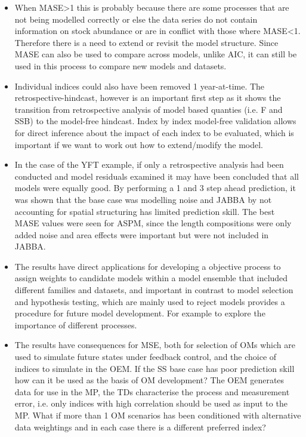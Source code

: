 \begin{itemize}
    \item When MASE>1 this is probably because there are some processes that are not being modelled correctly or else the data series do not contain information on stock abundance or are in conflict with those where MASE<1. Therefore there is a need to extend or revisit the model structure. Since MASE can also be used to compare across models, unlike AIC, it can still be used in this process to compare new models and datasets. 
    
    \item Individual indices could also have been removed 1 year-at-time. The retrospective-hindcast, however is an important first step as it shows the transition from retrospective analysis of model based quanties (i.e. F and SSB) to the model-free hindcast.  Index by index model-free validation allows for direct inference about the impact of each index to be evaluated, which is important if we want to work out how to extend/modify the model.     

    \item  In the case of the YFT example, if only a retrospective analysis had been conducted and model residuals examined it may have been concluded that all models were equally good. By performing a 1 and 3 step ahead prediction, it was shown that the base case was modelling noise and JABBA by not accounting for spatial structuring has limited prediction skill. The best MASE values were seen for ASPM, since the length compositions were only added noise and area effects were important but were not included in JABBA.

    \item  The results have direct applications for developing a objective process to assign weights to candidate models within a model ensemble that included different families and datasets, and important in contrast to model selection and hypothesis testing, which are mainly used to reject models provides a procedure for future model development. For example to explore the importance of different processes.


    \item The results have consequences for MSE, both for selection of OMs  which are used to simulate future states under feedback control, and the choice of indices to simulate in the OEM. If the SS base case has poor prediction skill how can it be used as the basis of OM development? The OEM generates data for use in the MP, the TDs characterise the process and measurement error, i.e. only indices with high correlation should be used as input to the MP. What if more than 1 OM scenarios has been conditioned with alternative data weightings and in each case there is a different preferred index? 

\end{itemize}
